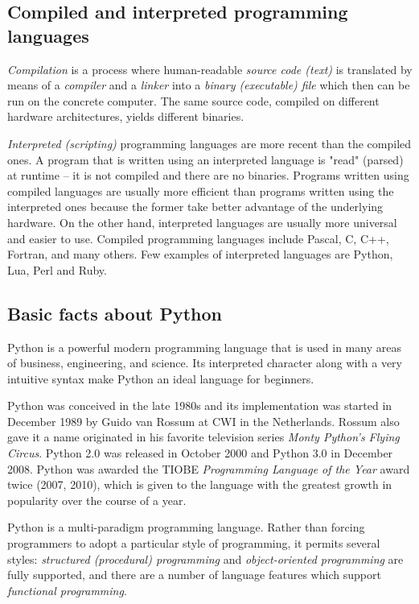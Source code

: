 \documentclass[article,A4,12pt]{llncs}
\begin{document}
\subsection{Compiled and interpreted programming languages}

{\em Compilation} is a process where human-readable {\em source code (text)} is translated by
means of a {\em compiler} and a {\em linker}
into a {\em binary (executable) file} which then can be run on the concrete computer. The same 
source code, compiled on different hardware architectures, yields different binaries. 

{\em Interpreted (scripting)} programming languages are more recent than the compiled ones. 
A program that is written using an interpreted language is "read" (parsed) at runtime -- it is 
not compiled and there are no binaries. Programs 
written using compiled languages are usually more efficient than programs written using the interpreted 
ones because the former take better advantage of the underlying hardware. On the other hand,
interpreted languages are usually more universal and easier to use. Compiled 
programming languages include Pascal, C, C++, Fortran, and many others. Few examples of interpreted 
languages are Python, Lua, Perl and Ruby. 

\subsection{Basic facts about Python}

Python is a powerful modern programming language that is used in many areas of business, 
engineering, and science. Its interpreted character along with a very intuitive syntax make Python an 
ideal language for beginners. 

Python was conceived in the late 1980s and its implementation was started in December 1989
by Guido van Rossum at CWI in the Netherlands. Rossum also gave it a name originated
in his favorite television series {\em Monty Python's Flying Circus}.
Python 2.0 was released in October 2000 and Python 3.0 in December 2008. Python was
awarded the TIOBE {\em Programming Language of the Year} award twice (2007, 2010), which is 
given to the language with the greatest growth in popularity over the course of a year.

Python is a multi-paradigm programming language. Rather than forcing programmers to 
adopt a particular style of programming, it permits several styles: {\em structured (procedural) 
programming} and {\em object-oriented programming} are fully supported, and there are a number 
of language features which support {\em functional programming}. 
\end{document}

